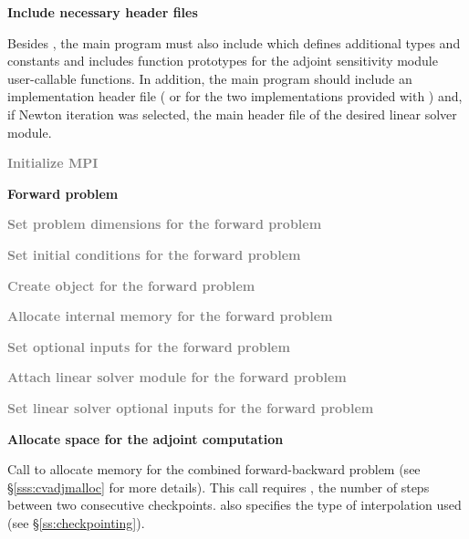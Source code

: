 \begin{Steps}

\item
  {\bf Include necessary header files}
  
  Besides , the main program must also include
   which defines additional types and constants and includes
  function prototypes for the adjoint sensitivity module user-callable functions.
  In addition, the main program should include an {\nvector} 
  implementation header file ( or 
  for the two implementations provided with {\cvodes}) and, if Newton iteration 
  was selected, the main header file of the desired linear solver module.

\item
  \textcolor{gray}{\bf {\p} Initialize MPI}

  \vspace{0.2in}\centerline{\bf Forward problem}

\item
  \textcolor{gray}{\bf Set problem dimensions for the forward problem}

\item
  \textcolor{gray}{\bf Set initial conditions for the forward problem}

\item
  \textcolor{gray}{\bf Create {\cvodes} object for the forward problem}

\item
  \textcolor{gray}{\bf Allocate internal memory for the forward problem}

\item
  \textcolor{gray}{\bf Set optional inputs for the forward problem}

\item
  \textcolor{gray}{\bf Attach linear solver module for the forward problem}

\item
  \textcolor{gray}{\bf Set linear solver optional inputs for the forward problem}

\item
  {\bf Allocate space for the adjoint computation}

  Call \id{()} to allocate memory for the 
  combined forward-backward problem (see \S\ref{sss:cvadjmalloc} for more details).
  This call requires , the number of steps between two consecutive checkpoints.
   also specifies the type of interpolation used 
  (see \S\ref{ss:checkpointing}).


\end{Steps}
